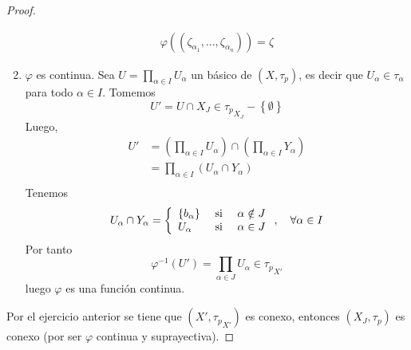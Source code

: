 \documentclass[12pt]{report}
\theoremstyle{largebreak}
\begin{document}
\begin{proof}
\begin{enumerate}
            \begin{equation*}
                \begin{split}
                    \varphi((\zeta_{\alpha_1},...,\zeta_{\alpha_n}))=\zeta
                \end{split}
            \end{equation*}
            \item $\varphi$ es continua. Sea $U=\prod_{\alpha\in I}U_\alpha$ un básico de $(X,\tau_p)$, es decir que $U_\alpha\in\tau_\alpha$ para todo $\alpha\in I$. Tomemos
            \begin{equation*}
                U'=U\cap X_J\in {\tau_p}_{ X_J}-\left\{\emptyset \right\}
            \end{equation*}
            Luego,
            \begin{equation*}
                \begin{split}
                    U'&=\left(\prod_{\alpha\in I}U_\alpha \right)\cap\left(\prod_{\alpha\in I}Y_\alpha \right)\\
                    &=\prod_{\alpha\in I}(U_\alpha\cap Y_\alpha)\\
                \end{split}
            \end{equation*}
            Tenemos
            \begin{equation*}
                U_\alpha\cap Y_\alpha=\left\{
                    \begin{array}{lcr}
                        \left\{b_\alpha\right\} & \textup{ si } & \alpha\notin J\\
                        U_\alpha & \textup{ si } & \alpha\in J\\
                    \end{array}
                \right.,\quad\forall \alpha\in I
            \end{equation*}
            Por tanto
            \begin{equation*}
                \varphi^{-1}(U')=\prod_{\alpha\in J}U_\alpha\in{\tau_p}_{X'}
            \end{equation*}
            luego $\varphi$ es una función continua.
        \end{enumerate}
        Por el ejercicio anterior se tiene que $(X',{\tau_p}_{X'})$ es conexo, entonces $(X_J,\tau_p)$ es conexo (por ser $\varphi$ continua y suprayectiva).


\end{proof}
\end{document}
